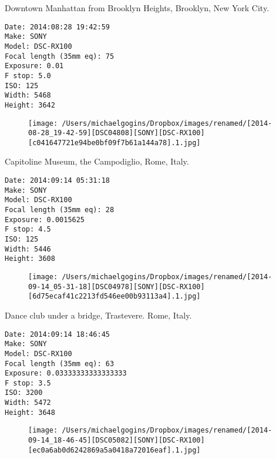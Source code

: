 \documentclass[11pt,letter,DIV=14,paper=landscape]{scrbook}
\begin{document}
\clearpage
\noindent Downtown Manhattan from Brooklyn Heights, Brooklyn, New York City.
\noindent
\begin{lstlisting}
Date: 2014:08:28 19:42:59
Make: SONY
Model: DSC-RX100
Focal length (35mm eq): 75
Exposure: 0.01
F stop: 5.0
ISO: 125
Width: 5468
Height: 3642
\end{lstlisting}
\clearpage

\begin{figure}
\texttt{[image: /Users/michaelgogins/Dropbox/images/renamed/[2014-08-28\_19-42-59][DSC04808][SONY][DSC-RX100][c041647721e94be0bf09f7b61a144a78].1.jpg]}
\end{figure}
    
\clearpage
\noindent Capitoline Museum, the Campodiglio, Rome, Italy.
\noindent
\begin{lstlisting}
Date: 2014:09:14 05:31:18
Make: SONY
Model: DSC-RX100
Focal length (35mm eq): 28
Exposure: 0.0015625
F stop: 4.5
ISO: 125
Width: 5446
Height: 3608
\end{lstlisting}
\clearpage

\begin{figure}
\texttt{[image: /Users/michaelgogins/Dropbox/images/renamed/[2014-09-14\_05-31-18][DSC04978][SONY][DSC-RX100][6d75ecaf41c2213fd546ee00b93113a4].1.jpg]}
\end{figure}
    
\clearpage
\noindent Dance club under a bridge, Trastevere. Rome, Italy.
\noindent
\begin{lstlisting}
Date: 2014:09:14 18:46:45
Make: SONY
Model: DSC-RX100
Focal length (35mm eq): 63
Exposure: 0.03333333333333333
F stop: 3.5
ISO: 3200
Width: 5472
Height: 3648
\end{lstlisting}
\clearpage

\begin{figure}
\texttt{[image: /Users/michaelgogins/Dropbox/images/renamed/[2014-09-14\_18-46-45][DSC05082][SONY][DSC-RX100][ec0a6ab0d6242869a5a0418a72016eaf].1.jpg]}
\end{figure}
    
\end{document}
